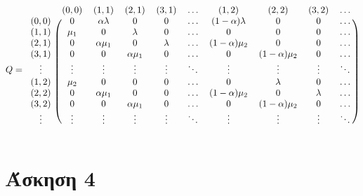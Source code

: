 \documentclass[a4paper,11pt]{article}
\begin{document}
\[
	Q =
	\begin{blockarray}{cccccccccc}
		& (0,0) & (1,1) & (2,1) & (3,1) & \dots & (1,2) & (2,2) & (3,2) & \dots \\
		\begin{block}{c(ccccccccc)}
			(0,0) & 0 & \alpha \lambda & 0 & 0 & \dots & (1-\alpha) \lambda & 0 & 0 & \dots \\
			(1,1) & \mu_1 & 0 & \lambda & 0 & \dots & 0 & 0 & 0 & \dots \\
			(2,1) & 0 & \alpha \mu_1 & 0 & \lambda & \dots & (1-\alpha) \mu_2 & 0 & 0 & \dots \\
			(3,1) & 0 & 0 & \alpha \mu_1 & 0 & \dots & 0 & (1-\alpha) \mu_2 & 0 & \dots \\
			\vdots & \vdots & \vdots & \vdots & \vdots & \ddots & \vdots & \vdots & \vdots & \ddots \\
			(1,2) & \mu_2 & 0 & 0 & 0 & \dots & 0 & \lambda & 0 & \dots \\
			(2,2) & 0 & \alpha \mu_1 & 0 & 0 & \dots & (1-\alpha) \mu_2 & 0 & \lambda & \dots \\
			(3,2) & 0 & 0 & \alpha \mu_1 & 0 & \dots & 0 & (1-\alpha) \mu_2 & 0 & \dots \\
			\vdots & \vdots & \vdots & \vdots & \vdots & \ddots & \vdots & \vdots & \vdots & \ddots \\
		\end{block}
	\end{blockarray}
\]


\section*{Άσκηση 4}
\end{document}
